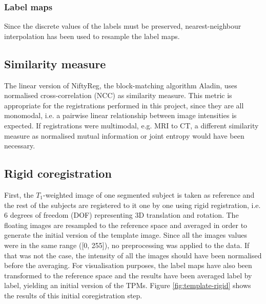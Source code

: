 \subsubsection{Label maps} Since the discrete values of the labels must be preserved, nearest-neighbour interpolation has been used to resample the label maps.



\subsection{Similarity measure}
The linear version of NiftyReg, the block-matching algorithm Aladin, uses normalised cross-correlation (NCC) as similarity measure. This metric is appropriate for the registrations performed in this project, since they are all monomodal, i.e. a pairwise linear relationship between image intensities is expected. If registrations were multimodal, e.g. MRI to CT, a different similarity measure as normalised mutual information or joint entropy would have been necessary.



\subsection{Rigid coregistration}
First, the $T_1$-weighted image of one segmented subject is taken as reference and the rest of the subjects are registered to it one by one using rigid registration, i.e. 6 degrees of freedom (DOF) representing 3D translation and rotation. The floating images are resampled to the reference space and averaged in order to generate the initial version of the template image. Since all the images values were in the same range ([0, 255]), no preprocessing was applied to the data. If that was not the case, the intensity of all the images should have been normalised before the averaging. For visualisation purposes, the label maps have also been transformed to the reference space and the results have been averaged label by label, yielding an initial version of the TPMs. Figure \ref{fig:template-rigid} shows the results of this initial coregistration step.


